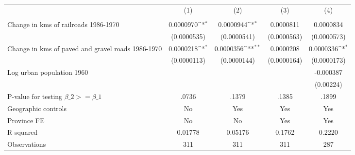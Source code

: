{
\def\sym#1{\ifmmode^{#1}\else\(^{#1}\)\fi}
\begin{tabular}{l*{4}{c}}
\hline\hline
                &\multicolumn{1}{c}{(1)}&\multicolumn{1}{c}{(2)}&\multicolumn{1}{c}{(3)}&\multicolumn{1}{c}{(4)}\\
                &\multicolumn{1}{c}{}&\multicolumn{1}{c}{}&\multicolumn{1}{c}{}&\multicolumn{1}{c}{}\\
\hline
Change in kms of railroads 1986-1970&0.0000970\sym{*}  &0.0000944\sym{*}  &0.0000811         &0.0000834         \\
                &(0.0000535)         &(0.0000541)         &(0.0000563)         &(0.0000573)         \\
[1em]
Change in kms of paved and gravel roads 1986-1970&0.0000218\sym{*}  &0.0000356\sym{**} &0.0000208         &0.0000336\sym{*}  \\
                &(0.0000113)         &(0.0000144)         &(0.0000164)         &(0.0000173)         \\
[1em]
Log urban population 1960&                  &                  &                  &-0.000387         \\
                &                  &                  &                  &(0.00224)         \\
\hline
P-value for testing $\beta\_{2} >= \beta\_{1}$&    .0736         &    .1379         &    .1385         &    .1899         \\
Geographic controls&       No         &      Yes         &      Yes         &      Yes         \\
Province FE     &       No         &       No         &      Yes         &      Yes         \\
R-squared       &  0.01778         &  0.05176         &   0.1762         &   0.2220         \\
Observations    &      311         &      311         &      311         &      287         \\
\hline\hline
\end{tabular}
}
